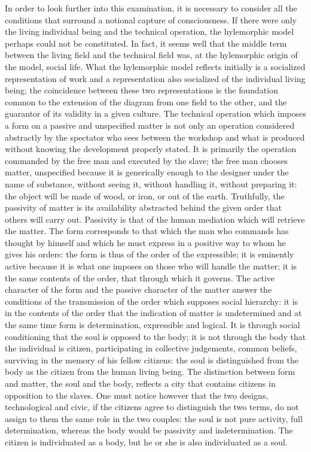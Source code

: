 \documentclass[a4paper]{article}
\begin{document}
In order to look further into this examination, it is necessary to consider all the conditions that surround a notional capture of consciousness. If there were only the living individual being and the technical operation, the hylemorphic model perhaps could not be constituted. In fact, it seems well that the middle term between the living field and the technical field was, at the hylemorphic origin of the model, social life. What the hylemorphic model reflects initially is a socialized representation of work and a representation also socialized of the individual living being; the coincidence between these two representations is the foundation common to the extension of the diagram from one field to the other, and the guarantor of its validity in a given culture. The technical operation which imposes a form on a passive and unspecified matter is not only an operation considered abstractly by the spectator who sees between the workshop and what is produced without knowing the development properly stated. It is primarily the operation commanded by the free man and executed by the slave; the free man chooses matter, unspecified because it is generically enough to the designer under the name of substance, without seeing it, without handling it, without preparing it: the object will be made of wood, or iron, or out of the earth. Truthfully, the passivity of matter is its availability abstracted behind the given order that others will carry out. Passivity is that of the human mediation which will retrieve the matter. The form corresponds to that which the man who commands has thought by himself and which he must express in a positive way to whom he gives his orders: the form is thus of the order of the expressible; it is eminently active because it is what one imposes on those who will handle the matter; it is the same contents of the order, that through which it governs. The active character of the form and the passive character of the matter answer the conditions of the transmission of the order which supposes social hierarchy: it is in the contents of the order that the indication of matter is undetermined and at the same time form is determination, expressible and logical. It is through social conditioning that the soul is opposed to the body; it is not through the body that the individual is citizen, participating in collective judgements, common beliefs, surviving in the memory of his fellow citizens: the soul is distinguished from the body as the citizen from the human living being. The distinction between form and matter, the soul and the body, reflects a city that contains citizens in opposition to the slaves. One must notice however that the two designs, technological and civic, if the citizens agree to distinguish the two terms, do not assign to them the same role in the two couples: the soul is not pure activity, full determination, whereas the body would be passivity and indetermination. The citizen is individuated as a body, but he or she is also individuated as a soul.
\end{document}
